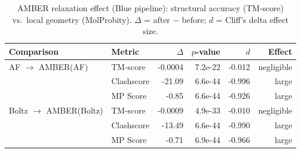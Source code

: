 \begin{table}[htbp]
\centering
\caption{AMBER relaxation effect (Blue pipeline): structural accuracy (TM-score) vs.\ local geometry (MolProbity). $\Delta$ = after $-$ before; $d$ = Cliff's delta effect size.}
\label{tab:amber-dual-blue}
\begin{tabular}{llrrrr}
\toprule
Comparison & Metric & $\Delta$ & $p$-value & $d$ & Effect \\
\midrule
  AF $\to$ AMBER(AF) & TM-score & -0.0004 & 7.2e-22 & -0.012 & negligible \\
  & Clashscore & -21.09 & 6.6e-44 & -0.996 & large \\
  & MP Score & -0.85 & 6.6e-44 & -0.926 & large \\
  \midrule
  Boltz $\to$ AMBER(Boltz) & TM-score & -0.0009 & 4.9e-33 & -0.010 & negligible \\
  & Clashscore & -13.49 & 6.6e-44 & -0.990 & large \\
  & MP Score & -0.71 & 6.9e-44 & -0.966 & large \\
\bottomrule
\end{tabular}
\end{table}